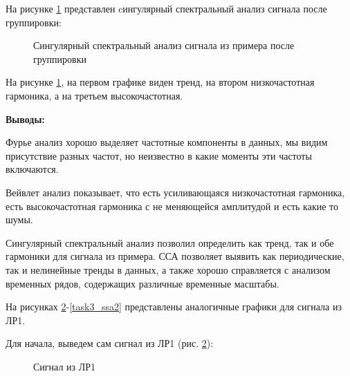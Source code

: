 \documentclass[a4paper,oneside,14pt]{extreport}
\begin{document}
На рисунке \ref{task1_ssa1} представлен cингулярный спектральный анализ сигнала после группировки:

\begin{figure}[!h]
	\caption{Сингулярный спектральный анализ сигнала из примера после группировки}
	\label{task1_ssa1}
\end{figure}

На рисунке \ref{task1_ssa1}, на первом графике виден тренд, на втором низкочастотная гармоника, а на третьем высокочастотная.

\newpage
\noindent\textbf{Выводы:}

Фурье анализ хорошо выделяет частотные компоненты в данных, мы видим присутствие разных частот, но неизвестно в какие моменты эти частоты включаются. 

Вейвлет анализ показывает, что есть усиливающаяся низкочастотная гармоника, есть высокочастотная гармоника с не меняющейся амплитудой и есть какие то шумы.

Сингулярный спектральный анализ позволил определить как тренд, так и обе гармоники для сигнала из примера. ССА позволяет выявить как периодические, так и нелинейные тренды в данных, а также хорошо справляется с анализом временных рядов, содержащих различные временные масштабы.


\newpage
На рисунках \ref{task1_garm2}-\ref{task3_ssa2} представлены аналогичные графики для сигнала из ЛР1.

Для начала, выведем сам сигнал из ЛР1 (рис. \ref{task1_garm2}):

\begin{figure}[!h]
	\caption{Сигнал из ЛР1}
	\label{task1_garm2}
\end{figure}
\end{document}
